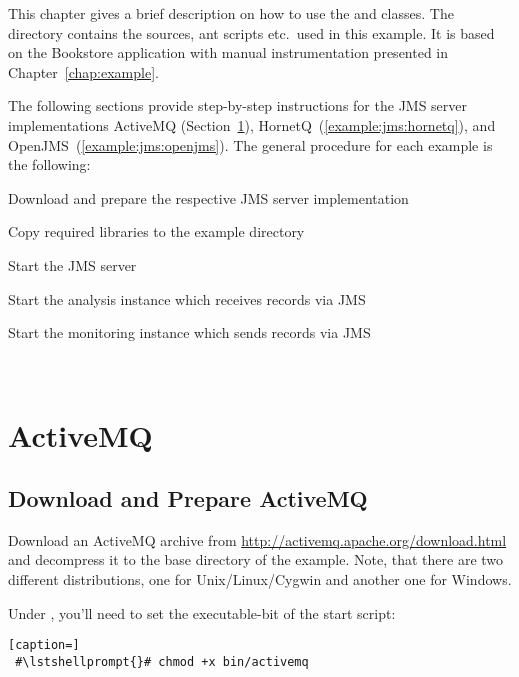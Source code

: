 This chapter gives a brief description on how to use the  and  %
classes. The directory \dir{\JMSBookstoreApplicationDirDistro/} contains the %
sources, ant scripts etc.\ used in this example. It is based on the Bookstore %
application with manual instrumentation presented in Chapter~\ref{chap:example}. %

The following sections provide step-by-step instructions for the %
JMS server implementations ActiveMQ (Section~\ref{example:jms:activemq}), %
HornetQ~(\ref{example:jms:hornetq}), and OpenJMS~(\ref{example:jms:openjms}).
The general procedure for each example is the following:

\medskip

\begin{compactenum}
 \item Download and prepare the respective JMS server implementation
 \item Copy required libraries to the example directory
 \item Start the JMS server
 \item Start the analysis instance which receives records via JMS
 \item Start the monitoring instance which sends records via JMS
\end{compactenum}

\


\section{ActiveMQ}\label{example:jms:activemq}

\subsection{Download and Prepare ActiveMQ}

Download an ActiveMQ archive from \url{http://activemq.apache.org/download.html}
and decompress it to the base directory of the example. Note, that there are two different %
distributions, one for Unix/Linux/Cygwin and another one for Windows. 

Under \UnixLikeSystems{}, you'll need to set the executable-bit of the start script:

\setBashListing
\begin{lstlisting}[caption=]
 #\lstshellprompt{}# chmod +x bin/activemq
\end{lstlisting}

